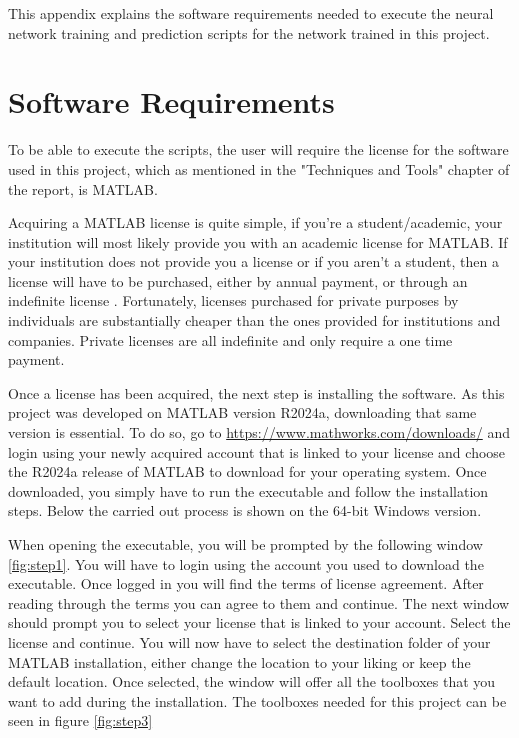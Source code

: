 
This appendix explains the software requirements needed to execute the neural network training and prediction scripts for the network trained in this project.

\section{Software Requirements}
To be able to execute the scripts, the user will require the license for the software used in this project, which as mentioned in the "Techniques and Tools" chapter of the report, is MATLAB. 

Acquiring a MATLAB license is quite simple, if you're a student/academic, your institution will most likely provide you with an academic license for MATLAB. If your institution does not provide you a license or if you aren't a student, then a license will have to be purchased, either by annual payment, or through an indefinite license \cite{matlab:cost}. Fortunately, licenses purchased for private purposes by individuals are substantially cheaper than the ones provided for institutions and companies. Private licenses are all indefinite and only require a one time payment.

Once a license has been acquired, the next step is installing the software. As this project was developed on MATLAB version R2024a, downloading that same version is essential. To do so, go to \url{https://www.mathworks.com/downloads/} and login using your newly acquired account that is linked to your license and choose the R2024a release of MATLAB to download for your operating system. Once downloaded, you simply have to run the executable and follow the installation steps. Below the carried out process is shown on the 64-bit Windows version.


When opening the executable, you will be prompted by the following window \ref{fig:step1}. You will have to login using the account you used to download the executable. Once logged in you will find the terms of license agreement. After reading through the terms you can agree to them and continue. The next window should prompt you to select your license that is linked to your account. Select the license and continue. You will now have to select the destination folder of your MATLAB installation, either change the location to your liking or keep the default location. Once selected, the window will offer all the toolboxes that you want to add during the installation. The toolboxes needed for this project can be seen in figure \ref{fig:step3}

